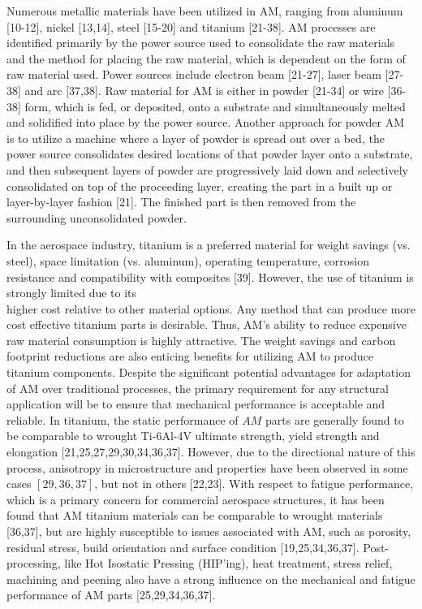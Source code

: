 \documentclass[10pt]{article}
\begin{document}
Numerous metallic materials have been utilized in AM, ranging from aluminum [10-12], nickel [13,14], steel [15-20] and titanium [21-38]. AM processes are identified primarily by the power source used to consolidate the raw materials and the method for placing the raw material, which is dependent on the form of raw material used. Power sources include electron beam [21-27], laser beam [27-38] and arc [37,38]. Raw material for AM is either in powder [21-34] or wire [36-38] form, which is fed, or deposited, onto a substrate and simultaneously melted and solidified into place by the power source. Another approach for powder AM is to utilize a machine where a layer of powder is spread out over a bed, the power source consolidates desired locations of that powder layer onto a substrate, and then subsequent layers of powder are progressively laid down and selectively consolidated on top of the proceeding layer, creating the part in a built up or layer-by-layer fashion [21]. The finished part is then removed from the surrounding unconsolidated powder.

In the aerospace industry, titanium is a preferred material for weight savings (vs. steel), space limitation (vs. aluminum), operating temperature, corrosion resistance and compatibility with composites [39]. However, the use of titanium is strongly limited due to its\\
higher cost relative to other material options. Any method that can produce more cost effective titanium parts is desirable. Thus, AM's ability to reduce expensive raw material consumption is highly attractive. The weight savings and carbon footprint reductions are also enticing benefits for utilizing AM to produce titanium components. Despite the significant potential advantages for adaptation of AM over traditional processes, the primary requirement for any structural application will be to ensure that mechanical performance is acceptable and reliable. In titanium, the static performance of $A M$ parts are generally found to be comparable to wrought Ti-6Al-4V ultimate strength, yield strength and elongation [21,25,27,29,30,34,36,37]. However, due to the directional nature of this process, anisotropy in microstructure and properties have been observed in some cases $[29,36,37]$, but not in others [22,23]. With respect to fatigue performance, which is a primary concern for commercial aerospace structures, it has been found that AM titanium materials can be comparable to wrought materials [36,37], but are highly susceptible to issues associated with AM, such as porosity, residual stress, build orientation and surface condition [19,25,34,36,37]. Post-processing, like Hot Isostatic Pressing (HIP'ing), heat treatment, stress relief, machining and peening also have a strong influence on the mechanical and fatigue performance of AM parts [25,29,34,36,37].
\end{document}
